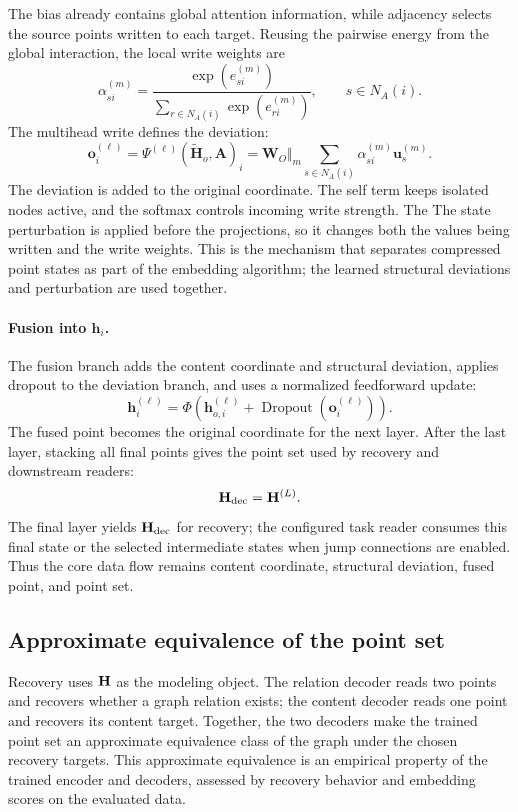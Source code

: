 The bias already contains global attention information, while adjacency selects
the source points written to each target.  Reusing the pairwise energy from the
global interaction, the local write weights are
\begin{equation}
 \alpha_{si}^{(m)}=\frac{\exp(e_{si}^{(m)})}
 {\sum_{r\in N_A(i)}\exp(e_{ri}^{(m)})},\qquad s\in N_A(i).
 \label{eq:local-write-weight}
\end{equation}
The multihead write defines the deviation:
\begin{equation}
 \mathbf o_i^{(\ell)}=\Psi^{(\ell)}(\widetilde{\mathbf H}_o,\mathbf A)_i
 =\mathbf W_O\Vert_m\sum_{s\in N_A(i)}\alpha_{si}^{(m)}\mathbf u_s^{(m)}.
 \label{eq:deviation}
\end{equation}
The deviation is added to the original coordinate.  The self term keeps
isolated nodes active, and the softmax controls incoming write strength.  The
The state perturbation is applied before the projections, so it changes both
the values being written and the write weights.  This is the mechanism that
separates compressed point states as part of the embedding algorithm; the
learned structural deviations and perturbation are used together.

\paragraph{Fusion into $\mathbf h_i$.}
The fusion branch adds the content coordinate and structural deviation, applies
dropout to the deviation branch, and uses a normalized feedforward update:
\begin{equation}
 \mathbf h_i^{(\ell)}=\Phi\!\left(\mathbf h_{o,i}^{(\ell)}+\operatorname{Dropout}(\mathbf o_i^{(\ell)})\right).
 \label{eq:fusion}
\end{equation}
The fused point becomes the original coordinate for the next layer.  After the
last layer, stacking all final points gives the point set used by recovery and
downstream readers:
\begin{equation}
 \mathbf{H}_{\mathrm{dec}}=\mathbf H^{(L)}.
 \label{eq:decoder-state}
\end{equation}
The final layer yields $\mathbf{H}_{\mathrm{dec}}$ for recovery; the configured
task reader consumes this final state or the selected intermediate states when
jump connections are enabled.  Thus the core data flow remains
content coordinate, structural deviation, fused point, and point set.

\subsection{Approximate equivalence of the point set}
\label{sec:recovery}
Recovery uses $\mathbf{H}$ as the modeling object.  The relation decoder reads two
points and recovers whether a graph relation exists; the content decoder reads
one point and recovers its content target.  Together, the two decoders make the
trained point set an approximate equivalence class of the graph under the chosen
recovery targets.  This approximate equivalence is an empirical property of the
trained encoder and decoders, assessed by recovery behavior and embedding scores
on the evaluated data.

